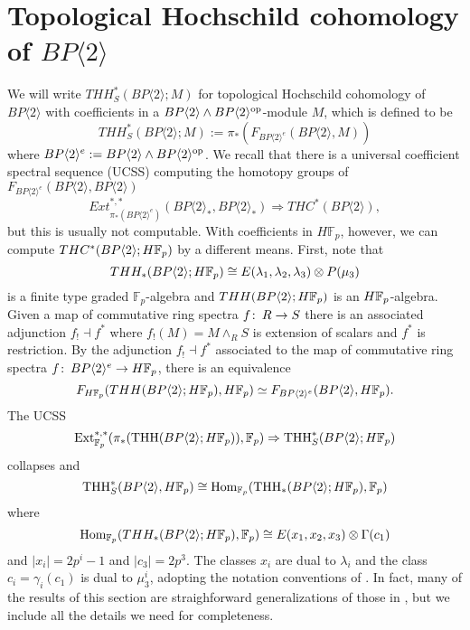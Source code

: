 
\section{Topological Hochschild cohomology of $BP\langle 2\rangle$}
We will write $THH_S^*(BP\langle 2\rangle ; M)$ for topological Hochschild cohomology of $BP\langle 2\rangle$ with coefficients in a $BP\langle 2 \rangle\wedge BP\langle 2 \rangle^{\mathrm{op}}$-module $M$, which is defined to be
\[ THH_S^*(BP\langle 2\rangle;M) := \pi_* \left ( F_{BP\langle 2\rangle^e} (BP\langle 2\rangle,M) \right )  \]
where $BP\langle 2\rangle^e:=BP\langle 2\rangle\wedge BP\langle 2\rangle^{\mathrm{op}}$. 
We recall that there is a universal coefficient spectral sequence (UCSS) computing the homotopy groups of $F_{BP\langle 2\rangle^e} (BP\langle 2\rangle,BP\langle 2\rangle)$ 
\[ Ext_{ \pi_*(BP\langle 2\rangle^e)}^{*,*} (BP\langle 2\rangle_*,BP\langle 2\rangle_*) \Rightarrow THC^*(BP\langle 2\rangle), \]
but this is usually not computable. With coefficients in $H\mathbb{F}_p$, however, we can compute $THC^*(BP\langle 2 \rangle;H\mathbb{F}_p)$ by a different means. First, note that 
\[ THH_*(BP\langle 2 \rangle; H\mathbb{F}_p)\cong E(\lambda_1,\lambda_2,\lambda_3)\otimes P(\mu_3)\]
 is a finite type graded $\mathbb{F}_p$-algebra and $THH(BP\langle 2\rangle; H\mathbb{F}_p)$ is an $H\mathbb{F}_p$-algebra. Given a map of commutative ring spectra $f\colon \thinspace R\to S$ there is an associated adjunction $f_!\dashv f^*$ where $f_!(M)=M\wedge_RS$ is extension of scalars and $f^*$ is restriction. By the adjunction $ f_! \dashv f^*$ associated to the map of commutative ring spectra 
$f\colon \thinspace BP\langle 2 \rangle^e\to H\mathbb{F}_p$, there is an equivalence
\[ F_{H\mathbb{F}_p} (THH(BP\langle 2 \rangle ; H\mathbb{F}_p ) , H\mathbb{F}_p ) \simeq F_{BP\langle 2 \rangle^e}(BP\langle 2 \rangle , H\mathbb{F}_p). \] 
The UCSS 
\[ \operatorname{Ext}_{\mathbb{F}_p}^{*,*}(\pi_*(\operatorname{THH}(BP\langle 2 \rangle;H\mathbb{F}_p)),\mathbb{F}_p) \Rightarrow \operatorname{THH}_S^*(BP\langle 2 \rangle;H\mathbb{F}_p)\]
collapses and 
\begin{equation}\label{THCHFp} \operatorname{THH}_S^*(BP\langle 2 \rangle , H\mathbb{F}_p)\cong \operatorname{Hom}_{\mathbb{F}_p}(\operatorname{THH}_*(BP\langle 2 \rangle;H\mathbb{F}_p),\mathbb{F}_p) \end{equation}
where 
\[\operatorname{Hom}_{\mathbb{F}_p}(THH_*(BP\langle 2 \rangle;H\mathbb{F}_p),\mathbb{F}_p) \cong E(x_1,x_2,x_3)\otimes \Gamma(c_1) \]
and $|x_i|=2p^i-1$ and $|c_3|=2p^3$. The classes $x_i$ are dual to $\lambda_i$ and the class $c_{i}=\gamma_i(c_1)$ is dual to $\mu_3^i$, adopting the notation conventions of \cite{AHL}.  In fact, many of the results of this section are straighforward generalizations of those in \cite{AHL}, but we include all the details we need for completeness. 

